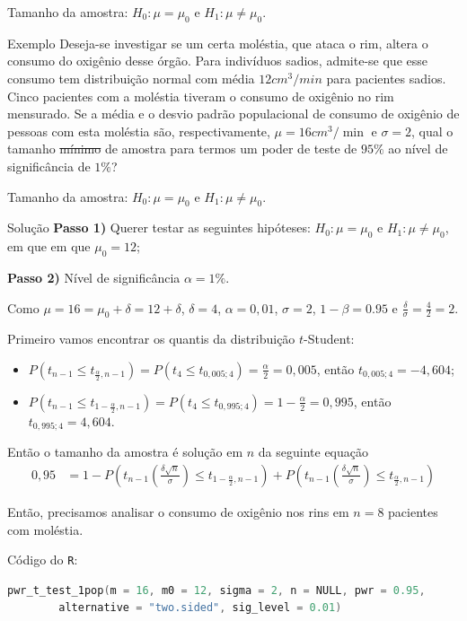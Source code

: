 \documentclass[8pt]{beamer}
\begin{document}
\begin{frame}{Tamanho da amostra: $H_0:\mu = \mu_0$ e $H_1: \mu \neq \mu_0$.}

\large
\begin{block}{Exemplo}
	Deseja-se investigar se um certa moléstia, que ataca o rim, altera o consumo do oxigênio desse órgão. Para indivíduos sadios, admite-se que esse consumo tem distribuição normal com média $12cm^3/min$ para pacientes sadios.
	Cinco pacientes com a moléstia tiveram o consumo de oxigênio no rim mensurado. Se a média e o desvio padrão populacional de consumo de oxigênio de pessoas com esta moléstia são, respectivamente, $\mu=16cm^3/\min$ e $\sigma=2$, qual o tamanho \sout{mínimo} de amostra para termos um poder de teste de $95\%$ ao nível de significância de $1\%$?
\end{block}
\normalsize

\end{frame}

\begin{frame}[fragile]{Tamanho da amostra: $H_0:\mu = \mu_0$ e $H_1: \mu \neq \mu_0$.}


\begin{block}{Solução}
	\textbf{Passo 1)} Querer testar as seguintes hipóteses: $H_0: \mu = \mu_0$ e $H_1: \mu \neq \mu_0$, em que 	em que $\mu_0=12$;

	
	\textbf{Passo 2)} Nível de significância $\alpha=1\%$.

	
	Como $\mu=16=\mu_0+\delta=12+\delta$, $\delta=4$, $\alpha=0,01$, $\sigma=2$, $1-\beta=0.95$ e $\frac{\delta}{\sigma} = \frac{4}{2}=2$.
	
	Primeiro vamos encontrar os quantis da distribuição $t$-Student:
	\begin{itemize}
		\item $P(t_{n-1} \leq t_{\frac{\alpha}{2}, n-1} ) = P(t_{4} \leq t_{0,005; 4} ) = \frac{\alpha}{2} = 0,005$, então $t_{0,005; 4}=-4,604$;
		\item $P(t_{n-1} \leq t_{1-\frac{\alpha}{2}, n-1} ) = P(t_{4} \leq t_{0,995; 4} ) =1- \frac{\alpha}{2} = 0,995$, então $t_{0,995; 4}=4,604$.
	\end{itemize}
	
	Então o tamanho da amostra é solução em $n$ da seguinte equação
	\begin{align*}
	0,95 &= 1 - P\left( t_{n-1}\left(\frac{\delta\sqrt{n}}{\sigma}\right) \leq t_{1-\frac{\alpha}{2}, n-1} \right) + P\left( t_{n-1}\left(\frac{\delta\sqrt{n}}{\sigma}\right) \leq t_{\frac{\alpha}{2}, n-1} \right)
	\end{align*} 
\end{block}
Então, precisamos analisar o consumo de oxigênio nos rins em $n=8$ pacientes com moléstia.

Código do \lstinline|R|:
\begin{lstlisting}[caption = Código no R., language = C]
pwr_t_test_1pop(m = 16, m0 = 12, sigma = 2, n = NULL, pwr = 0.95,
		alternative = "two.sided", sig_level = 0.01)
\end{lstlisting}

\end{frame}
\end{document}
